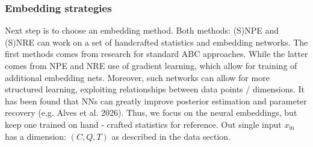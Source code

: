 \documentclass[12pt]{article}
\begin{document}
\subsubsection*{Embedding strategies} \label{sec: embedding_nets}
Next step is to choose an embedding method. Both methods: (S)NPE and (S)NRE can work on a set of handcrafted statistics and embedding networks. The first methods comes from research for standard ABC approaches. While the latter comes from NPE and NRE use of gradient learning, which allow for training of additional embedding nets. Moreover, such networks can allow for more structured learning, exploiting relationships between data points / dimensions. It has been found that NNs can greatly improve posterior estimation and parameter recovery (e.g. Alves et al. 2026). Thus, we focus on the neural embeddings, but keep one trained on hand - crafted statistics for reference. Out single input $x_\text{in}$ has a dimension: $(C, Q, T)$ as described in the data section.
\end{document}

